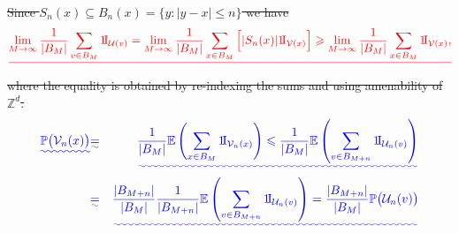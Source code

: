 \documentclass{article}
\newcommand{\E}{\mathbb{E}}
\newcommand{\Pb}{\mathbb{P}}
\newcommand{\Z}{\mathbb{Z}}
\newcommand{\I}{1\!{\rm I}}
\providecommand{\DIFadd}[1]{{\protect\color{blue}\uwave{#1}}} %
\providecommand{\DIFdel}[1]{{\protect\color{red}\sout{#1}}}                      %
\providecommand{\DIFaddbegin}{} %
\providecommand{\DIFaddend}{} %
\providecommand{\DIFdelbegin}{} %
\providecommand{\DIFdelend}{} %
\begin{document}
\DIFdelbegin \DIFdel{Since $S_n(x)\subseteq B_n(x)=\big\{y:|y-x|\leqslant n\big\}$ we have
}\[\DIFdel{
 \lim_{M\to\infty} \frac1{|B_M|} \sum_{v\in B_M} \I_{\mathcal
  U(v)} =
 \lim_{M\to\infty} \frac1{|B_M|} \sum_{x\in B_M} \Big[ |S_n(x)| \I_{
\mathcal
                   V(x)} \Big]
 \geqslant \lim_{M\to\infty} \frac{1}{|B_M|} \sum_{x\in B_M} \I_{\mathcal V(x)},
}\]
\DIFdel{where the equality is obtained by re-indexing the sums and using amenability of
$\Z^d$.
}\DIFdelend \DIFaddbegin \begin{eqnarray*}\DIFadd{
\Pb\big(\mathcal V_{n}(x)\big)
	}& \DIFadd{= }&
\DIFadd{\frac1{|B_M|} \E \left( \sum_{x\in B_M}  \I_{\mathcal V_{n}(x)} \right)
	\leqslant 	
\frac1{|B_M|} \E \left( \sum_{v \in B_{M+n}}  \I_{\mathcal U_{n}(v)} \right) }\\
	& \DIFadd{=				}&
\DIFadd{\frac{|B_{M+n}|}{|B_M|} \frac1{|B_{M+n}|} \E \left( \sum_{v \in B_{M+n}}  
								\I_{\mathcal U_{n}(v)} \right)
	= 
\frac{|B_{M+n}|}{|B_M|} \Pb\big(\mathcal U_{n}(v)\big)
}\end{eqnarray*}
\DIFaddend 
\end{document}
